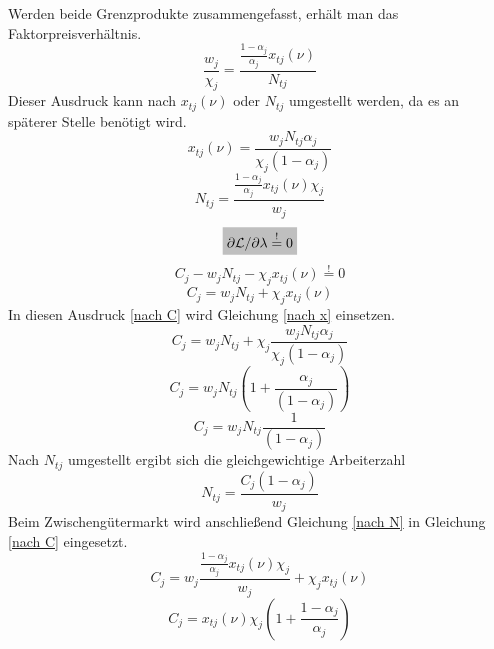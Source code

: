 Werden beide Grenzprodukte zusammengefasst, erhält man das Faktorpreisverhältnis. 
\begin{equation}
\frac{w_j}{\chi_j}=\frac{\frac{1-\alpha_j}{\alpha_j}x_{tj}(\nu)}{N_{tj}}
\end{equation}
Dieser Ausdruck kann nach $x_{tj}(\nu)$ oder $N_{tj}$ umgestellt werden, da es an späterer Stelle benötigt wird. 
\begin{equation}
x_{tj}(\nu)=\frac{w_jN_{tj}\alpha_j}{\chi_j(1-\alpha_j)}\label{nach x}
\end{equation}
\begin{equation}
N_{tj}=\frac{\frac{1-\alpha_j}{\alpha_j}x_{tj}(\nu)\chi_j}{w_j} \label{nach N}
\end{equation}
\begin{equation*}
\colorbox{lightgray}{$\partial \mathcal{L}/\partial \lambda \overset{!}{=} 0$}
\end{equation*}
\begin{equation*}
C_j-w_jN_{tj}-\chi_jx_{tj}(\nu)\overset{!}{=}0
\end{equation*}
\vspace{-0.5cm}
\begin{equation}
C_j=w_jN_{tj}+\chi_jx_{tj}(\nu) \label{nach C}
\end{equation}
In diesen Ausdruck \eqref{nach C} wird Gleichung \eqref{nach x} einsetzen.
\begin{equation*}
C_j=w_jN_{tj}+\chi_j\frac{w_jN_{tj}\alpha_j}{\chi_j(1-\alpha_j)}
\end{equation*}
\begin{equation*}
C_j=w_jN_{tj}\left(1+\frac{\alpha_j}{(1-\alpha_j)}\right)
\end{equation*}
\begin{equation*}
C_j=w_jN_{tj}\frac{1}{(1-\alpha_j)}
\end{equation*}
Nach $N_{tj}$ umgestellt ergibt sich die gleichgewichtige Arbeiterzahl
\begin{equation}
\boxed{N_{tj}=\frac{C_j(1-\alpha_j)}{w_j}}\label{GGArbeiter}
\end{equation}
Beim Zwischengütermarkt wird anschlie{\ss}end Gleichung \eqref{nach N} in Gleichung \eqref{nach C} eingesetzt.
\begin{equation*}
C_j=w_j\frac{\frac{1-\alpha_j}{\alpha_j}x_{tj}(\nu)\chi_j}{w_j}+\chi_jx_{tj}(\nu)
\end{equation*}
\begin{equation*}
C_j=x_{tj}(\nu)\chi_j\left(1+\frac{1-\alpha_j}{\alpha_j}\right)
\end{equation*}
